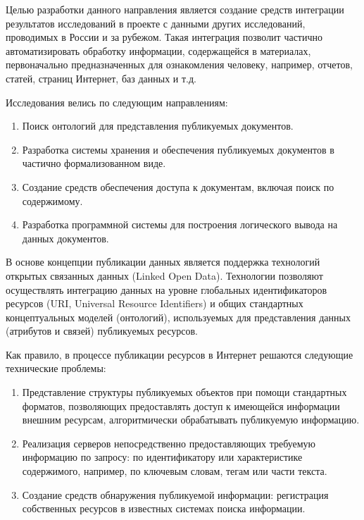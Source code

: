 \documentclass[a4paper,12pt,openany,final]{extreport}
\begin{document}
Целью разработки данного направления является создание средств
интеграции результатов исследований в проекте с данными других
исследований, проводимых в России и за рубежом. Такая интеграция
позволит частично автоматизировать обработку информации, содержащейся в
материалах, первоначально предназначенных для ознакомления человеку,
например, отчетов, статей, страниц Интернет, баз данных и т.д.

Исследования велись по следующим направлениям:

\begin{enumerate}
\def\labelenumi{\arabic{enumi}.}
\item
  Поиск онтологий для представления публикуемых документов.
\item
  Разработка системы хранения и обеспечения публикуемых документов в
  частично формализованном виде.
\item
  Создание средств обеспечения доступа к документам, включая поиск по
  содержимому.
\item
  Разработка программной системы для построения логического вывода на
  данных документов.
\end{enumerate}

В основе концепции публикации данных является поддержка технологий
открытых связанных данных (Linked Open Data). Технологии позволяют
осуществлять интеграцию данных на уровне глобальных идентификаторов
ресурсов (URI, Universal Resource Identifiers) и общих стандартных
концептуальных моделей (онтологий), используемых для представления
данных (атрибутов и связей) публикуемых ресурсов.

Как правило, в процессе публикации ресурсов в Интернет решаются
следующие технические проблемы:

\begin{enumerate}
\def\labelenumi{\arabic{enumi}.}
\item
  Представление структуры публикуемых объектов при помощи стандартных
  форматов, позволяющих предоставлять доступ к имеющейся информации
  внешним ресурсам, алгоритмически обрабатывать публикуемую информацию.
\item
  Реализация серверов непосредственно предоставляющих требуемую
  информацию по запросу: по идентификатору или характеристике
  содержимого, например, по ключевым словам, тегам или части текста.
\item
  Создание средств обнаружения публикуемой информации: регистрация
  собственных ресурсов в известных системах поиска информации.
\end{enumerate}
\end{document}
